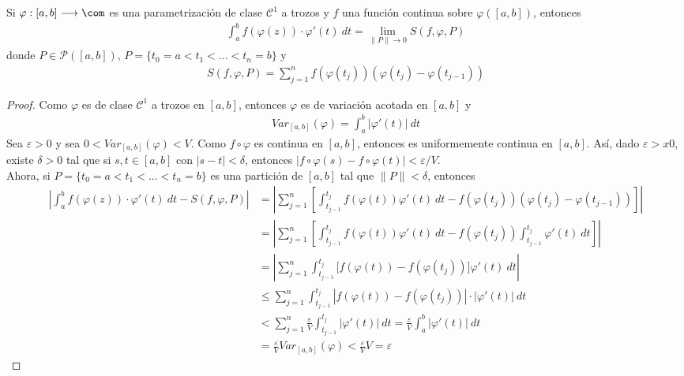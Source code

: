 \begin{lema}
Si $\varphi : [a,b] \longrightarrow \com$ es una parametrización de clase $\mathscr{C}^1$ a trozos y $f$ una función continua sobre $\varphi([a,b])$, entonces
\begin{align*}
    \int_{a}^{b}{f(\varphi(z))\cdot \varphi'(t) \ dt} = \lim_{\|P\| \to 0}{S(f,\varphi,P)}
\end{align*}
donde $P \in \mathcal{P}([a,b])$, $P = \{t_0 = a < t_1 < ... < t_n = b\}$ y
\begin{align*}
    S(f,\varphi,P) = \sum_{j=1}^{n}f(\varphi(t_j))(\varphi(t_j) - \varphi(t_{j-1}))
\end{align*}
\end{lema}

\begin{proof}
Como $\varphi$ es de clase $\mathscr{C}^1$ a trozos en $[a,b]$, entonces $\varphi$ es de variación acotada en $[a,b]$ y
\begin{align*}
    Var_{[a,b]}(\varphi) = \int_{a}^{b}{\left|\varphi'(t)\right| \ dt}
\end{align*}
Sea $\varepsilon > 0$ y sea $0 < Var_{[a,b]}(\varphi) < V$. Como $f \circ \varphi$ es continua en $[a,b]$, entonces es uniformemente continua en $[a,b]$. Así, dado $\varepsilon >x 0$, existe $\delta > 0$ tal que si $s,t \in [a,b]$ con $|s-t| < \delta$, entonces $|f \circ \varphi(s) - f \circ \varphi(t)| < \varepsilon/V$. 
\\
\newline
Ahora, si $P = \{t_0 = a < t_1 < ... < t_n = b\}$ es una partición de $[a,b]$ tal que $\|P\| < \delta$, entonces
\begin{align*}
    \left| \int_{a}^{b}{f(\varphi(z))\cdot \varphi'(t) \ dt} - {S(f,\varphi,P)} \right| &= \left| \sum_{j=1}^{n} \left[ \int_{t_{j-1}}^{t_j} f(\varphi(t))\varphi'(t) \ dt - f(\varphi(t_j))(\varphi(t_j) - \varphi(t_{j-1})) \right] \right| \\
    &= \left| \sum_{j=1}^{n} \left[ \int_{t_{j-1}}^{t_j} f(\varphi(t))\varphi'(t) \ dt -f(\varphi(t_j))\int_{t_{j-1}}^{t_j}{\varphi'(t) \ dt} \right] \right| \\
    &= \left| \sum_{j=1}^{n}  \int_{t_{j-1}}^{t_j} \Big[f(\varphi(t)) - f(\varphi(t_j))\Big]\varphi'(t) \ dt   \right| \\
    & \leq  \sum_{j=1}^{n}  \int_{t_{j-1}}^{t_j} |f(\varphi(t)) - f(\varphi(t_j))| \cdot |\varphi'(t)| \ dt  \\
    & <  \sum_{j=1}^{n}{\frac{\varepsilon}{V}\int_{t_{j-1}}^{t_j}|\varphi'(t)| \ dt} = \frac{\varepsilon}{V}\int_{a}^{b}{|\varphi'(t)| \ dt} \\
    &= \frac{\varepsilon}{V}Var_{[a,b]}(\varphi) < \frac{\varepsilon}{V}V = \varepsilon
\end{align*}
\end{proof}

